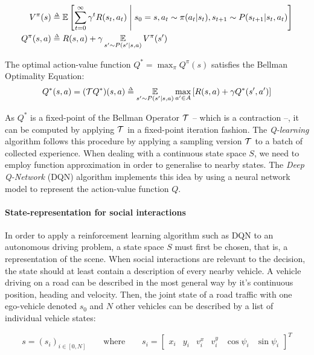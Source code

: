 \begin{align*}
V^\pi(s) &\eqdef \expectedvalue\left[\sum_{t=0}^\infty \gamma^t R(s_t, a_t)\condbar s_0=s, a_t\sim \pi(a_t|s_t), s_{t+1}\sim P(s_{t+1}|s_t, a_t)\right]\\
Q^\pi(s, a) &\eqdef R(s, a) + \gamma \expectedvalueover{s'\sim P(s'|s, a)} V^\pi(s')
\end{align*}

The optimal action-value function $Q^* =  \max_\pi Q^\pi(s)$ satisfies the Bellman Optimality Equation:
\begin{equation*}
Q^*(s, a) = (\cT Q^*) (s, a) \eqdef \expectedvalueover{s'\sim P(s'|s, a)} \max_{a'\in A} \left[R(s, a) + \gamma Q^*(s', a')\right]
\end{equation*}

As $Q^*$ is a fixed-point of the Bellman Operator $\mathcal{T}$ \citep{Bellman56} -- which is a contraction --, it can be computed by applying $\mathcal{T}$ in a fixed-point iteration fashion. The \emph{Q-learning} algorithm \citep{Watkins1992} follows this procedure by applying a sampling version $\mathcal{T}$ to a batch of collected experience. When dealing with a continuous state space $S$, we need to employ function approximation in order to generalise to nearby states. The \emph{Deep Q-Network} (DQN) algorithm \citep{Mnih2015} implements this idea by using a neural network model to represent the action-value function $Q$.

\paragraph{State-representation for social interactions}

In order to apply a reinforcement learning algorithm such as DQN to an autonomous driving problem, a state space $S$ must first be chosen, that is, a representation of the scene. When social interactions are relevant to the decision, the state should at least contain a description of every nearby vehicle. A vehicle driving on a road can be described in the most general way by it's continuous position, heading and velocity. Then, the joint state of a road traffic with one ego-vehicle denoted $s_0$ and $N$ other vehicles can be described by a list of individual vehicle states:

\begin{equation}
s = \left( s_i \right)_{i \in [0, N]}\qquad
\text{where}\qquad
s_i = \begin{bmatrix}
x_i & y_i & v^x_i & v^y_i & \cos\psi_i & \sin \psi_i
\end{bmatrix}^T
\label{eq:coordinates}
\end{equation}


